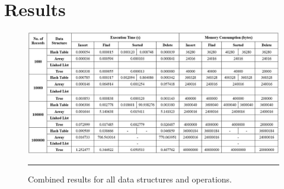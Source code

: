 \chapter{Results} %
\label{Chapter7}

\begin{figure}[H]
	\centering
	\includegraphics[scale =0.5]{./Figures/result.jpg}
	\rule{35em}{0.5pt}
	\caption{Combined results for all data structures and operations.}
	\label{fig:result}
\end{figure}
